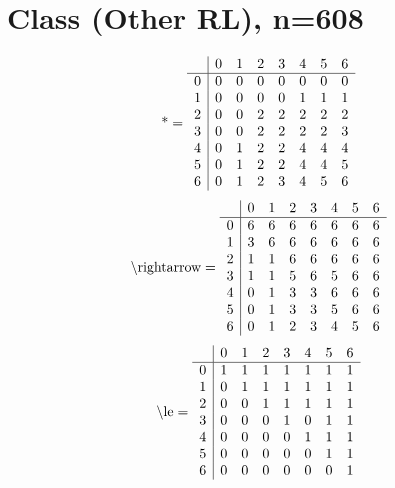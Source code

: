 \documentclass[11pt]{article}
\begin{document}
\section{Class (Other RL), n=608}
\[\text{*} = 
\begin{array}{r | r r r r r r r}
 & 0 & 1 & 2 & 3 & 4 & 5 & 6 \\ \hline
0 & 0 & 0 & 0 & 0 & 0 & 0 & 0 \\
1 & 0 & 0 & 0 & 0 & 1 & 1 & 1 \\
2 & 0 & 0 & 2 & 2 & 2 & 2 & 2 \\
3 & 0 & 0 & 2 & 2 & 2 & 2 & 3 \\
4 & 0 & 1 & 2 & 2 & 4 & 4 & 4 \\
5 & 0 & 1 & 2 & 2 & 4 & 4 & 5 \\
6 & 0 & 1 & 2 & 3 & 4 & 5 & 6 \\
\end{array}
\]
\[\text{\textbackslash rightarrow} = 
\begin{array}{r | r r r r r r r}
 & 0 & 1 & 2 & 3 & 4 & 5 & 6 \\ \hline
0 & 6 & 6 & 6 & 6 & 6 & 6 & 6 \\
1 & 3 & 6 & 6 & 6 & 6 & 6 & 6 \\
2 & 1 & 1 & 6 & 6 & 6 & 6 & 6 \\
3 & 1 & 1 & 5 & 6 & 5 & 6 & 6 \\
4 & 0 & 1 & 3 & 3 & 6 & 6 & 6 \\
5 & 0 & 1 & 3 & 3 & 5 & 6 & 6 \\
6 & 0 & 1 & 2 & 3 & 4 & 5 & 6 \\
\end{array}
\]
\[\text{\textbackslash le} = 
\begin{array}{r | r r r r r r r}
 & 0 & 1 & 2 & 3 & 4 & 5 & 6 \\ \hline
0 & 1 & 1 & 1 & 1 & 1 & 1 & 1 \\
1 & 0 & 1 & 1 & 1 & 1 & 1 & 1 \\
2 & 0 & 0 & 1 & 1 & 1 & 1 & 1 \\
3 & 0 & 0 & 0 & 1 & 0 & 1 & 1 \\
4 & 0 & 0 & 0 & 0 & 1 & 1 & 1 \\
5 & 0 & 0 & 0 & 0 & 0 & 1 & 1 \\
6 & 0 & 0 & 0 & 0 & 0 & 0 & 1 \\
\end{array}
\]
\end{document}
